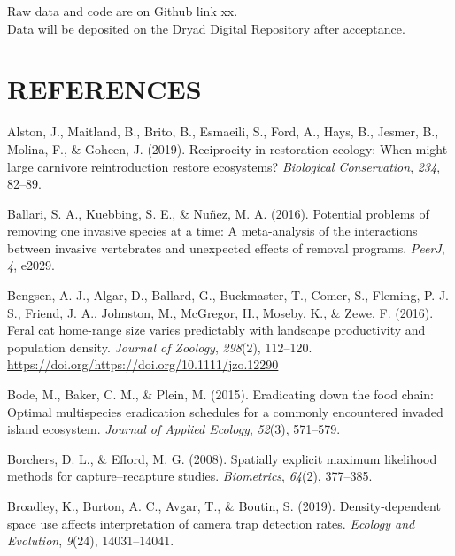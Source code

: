 \documentclass[]{elsarticle} %
\begin{document}
Raw data and code are on Github link xx.\\
Data will be deposited on the Dryad Digital Repository after acceptance.

\newpage

\hypertarget{references}{%
\section*{REFERENCES}\label{references}}

\hypertarget{refs}{}
\leavevmode\hypertarget{ref-alston2019}{}%
Alston, J., Maitland, B., Brito, B., Esmaeili, S., Ford, A., Hays, B., Jesmer, B., Molina, F., \& Goheen, J. (2019). Reciprocity in restoration ecology: When might large carnivore reintroduction restore ecosystems? \emph{Biological Conservation}, \emph{234}, 82--89.

\leavevmode\hypertarget{ref-ballari2016}{}%
Ballari, S. A., Kuebbing, S. E., \& Nuñez, M. A. (2016). Potential problems of removing one invasive species at a time: A meta-analysis of the interactions between invasive vertebrates and unexpected effects of removal programs. \emph{PeerJ}, \emph{4}, e2029.

\leavevmode\hypertarget{ref-https:ux2fux2fdoi.orgux2f10.1111ux2fjzo.12290}{}%
Bengsen, A. J., Algar, D., Ballard, G., Buckmaster, T., Comer, S., Fleming, P. J. S., Friend, J. A., Johnston, M., McGregor, H., Moseby, K., \& Zewe, F. (2016). Feral cat home-range size varies predictably with landscape productivity and population density. \emph{Journal of Zoology}, \emph{298}(2), 112--120. \url{https://doi.org/https://doi.org/10.1111/jzo.12290}

\leavevmode\hypertarget{ref-bode2015}{}%
Bode, M., Baker, C. M., \& Plein, M. (2015). Eradicating down the food chain: Optimal multispecies eradication schedules for a commonly encountered invaded island ecosystem. \emph{Journal of Applied Ecology}, \emph{52}(3), 571--579.

\leavevmode\hypertarget{ref-borchers2008}{}%
Borchers, D. L., \& Efford, M. G. (2008). Spatially explicit maximum likelihood methods for capture--recapture studies. \emph{Biometrics}, \emph{64}(2), 377--385.

\leavevmode\hypertarget{ref-broadley2019}{}%
Broadley, K., Burton, A. C., Avgar, T., \& Boutin, S. (2019). Density-dependent space use affects interpretation of camera trap detection rates. \emph{Ecology and Evolution}, \emph{9}(24), 14031--14041.
\end{document}
